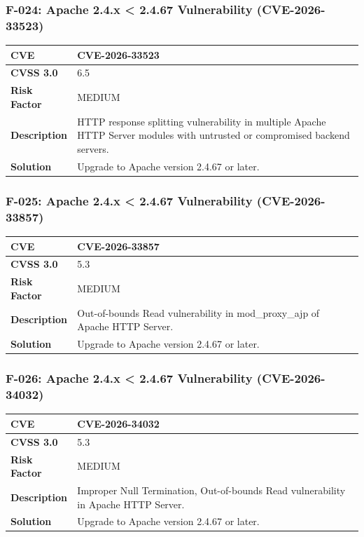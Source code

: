 \subsubsection{F-024: Apache 2.4.x < 2.4.67 Vulnerability (CVE-2026-33523)}
\begin{tabular}{|p{2.8cm}|p{12.2cm}|}
\hline
\textbf{CVE} & CVE-2026-33523 \\ \hline
\textbf{CVSS 3.0} & 6.5 \\ \hline
\textbf{Risk Factor} & MEDIUM \\ \hline
\textbf{Description} & HTTP response splitting vulnerability in multiple Apache HTTP Server modules with untrusted or compromised backend servers. \\ \hline
\textbf{Solution} & Upgrade to Apache version 2.4.67 or later. \\ \hline
\end{tabular}

\subsubsection{F-025: Apache 2.4.x < 2.4.67 Vulnerability (CVE-2026-33857)}
\begin{tabular}{|p{2.8cm}|p{12.2cm}|}
\hline
\textbf{CVE} & CVE-2026-33857 \\ \hline
\textbf{CVSS 3.0} & 5.3 \\ \hline
\textbf{Risk Factor} & MEDIUM \\ \hline
\textbf{Description} & Out-of-bounds Read vulnerability in mod\_proxy\_ajp of Apache HTTP Server. \\ \hline
\textbf{Solution} & Upgrade to Apache version 2.4.67 or later. \\ \hline
\end{tabular}

\subsubsection{F-026: Apache 2.4.x < 2.4.67 Vulnerability (CVE-2026-34032)}
\begin{tabular}{|p{2.8cm}|p{12.2cm}|}
\hline
\textbf{CVE} & CVE-2026-34032 \\ \hline
\textbf{CVSS 3.0} & 5.3 \\ \hline
\textbf{Risk Factor} & MEDIUM \\ \hline
\textbf{Description} & Improper Null Termination, Out-of-bounds Read vulnerability in Apache HTTP Server. \\ \hline
\textbf{Solution} & Upgrade to Apache version 2.4.67 or later. \\ \hline
\end{tabular}

